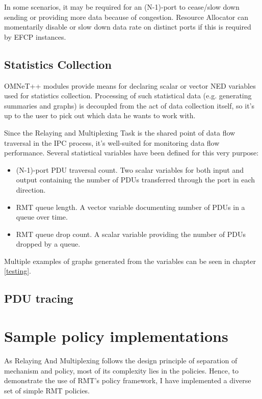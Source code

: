                 In some scenarios, it may be required for an (N-1)-port to cease/slow down sending or providing more data because of congestion. Resource Allocator can momentarily disable or slow down data rate on distinct ports if this is required by EFCP instances.


        \subsection{Statistics Collection}

            OMNeT++ modules provide means for declaring scalar or vector NED variables used for statistics collection. Processing of such statistical data (e.g. generating summaries and graphs) is decoupled from the act of data collection itself, so it's up to the user to pick out which data he wants to work with.

            Since the Relaying and Multiplexing Task is the shared point of data flow traversal in the IPC process, it's well-suited for monitoring data flow performance. Several statistical variables have been defined for this very purpose:

            \begin{itemize}
                \item (N-1)-port PDU traversal count. Two scalar variables for both input and output containing the number of PDUs transferred through the port in each direction.
                \item RMT queue length. A vector variable documenting number of PDUs in a queue over time.
                \item RMT queue drop count. A scalar variable providing the number of PDUs dropped by a queue.
            \end{itemize}

            Multiple examples of graphs generated from the variables can be seen in chapter \ref{testing}.

        \subsection{PDU tracing}

    \section{Sample policy implementations}

        As Relaying And Multiplexing follows the design principle of separation of mechanism and policy, most of its complexity lies in the policies. Hence, to demonstrate the use of RMT's policy framework, I have implemented a diverse set of simple RMT policies.

